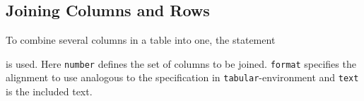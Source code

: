 

\subsection{Joining Columns and Rows}

To combine several columns in a table into one, the statement
%
\begin{GenericCode}[numbers=none]
\end{GenericCode}
%
is used. Here \texttt{number} defines the set of columns to be joined.
\texttt{format} specifies the alignment to use analogous to the specification
in \texttt{tabular}-environment and \texttt{text} is the included text.

